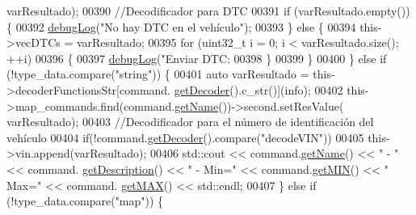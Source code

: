 \begin{DoxyCode}
{{{{{{{{{{      varResultado);
00390                                     \textcolor{comment}{//Decodificador para DTC}
00391                                     \textcolor{keywordflow}{if} (varResultado.empty())\{
00392                                         \hyperlink{debug_8hpp_a55f41cf7b0585224496de3d7adbc101c}{debugLog}(\textcolor{stringliteral}{"No hay DTC en el vehículo"});
00393                                     \} \textcolor{keywordflow}{else} \{
00394                                         this->vecDTCs = varResultado;
00395                                         \textcolor{keywordflow}{for} (uint32\_t i = 0; i < varResultado.size(); ++i)
00396                                         \{
00397                                             \hyperlink{debug_8hpp_a55f41cf7b0585224496de3d7adbc101c}{debugLog}(\textcolor{stringliteral}{"Enviar DTC: %
00398                                         \}
00399                                     \}
00400                                 \} \textcolor{keywordflow}{else} \textcolor{keywordflow}{if} (!type\_data.compare(\textcolor{stringliteral}{"string"})) \{
00401                                     \textcolor{keyword}{auto} varResultado = this->decoderFunctionsStr[command.
      \hyperlink{classCommands_a8b4c2a655d8dd3de334338d6684d469c}{getDecoder}().c\_str()](info);
00402                                     this->map\_commands.find(command.\hyperlink{classCommands_adf3d8a96310b1f4e57a6ecf0f2f153ea}{getName}())->second.setResValue(
      varResultado);
00403                                     \textcolor{comment}{//Decodificador para el número de identificación del vehículo}
00404                                     \textcolor{keywordflow}{if}(!command.\hyperlink{classCommands_a8b4c2a655d8dd3de334338d6684d469c}{getDecoder}().compare(\textcolor{stringliteral}{"decodeVIN"}))
00405                                         this->vin.append(varResultado);
00406                                     std::cout << command.\hyperlink{classCommands_adf3d8a96310b1f4e57a6ecf0f2f153ea}{getName}() << \textcolor{stringliteral}{" - "} << command.
      \hyperlink{classCommands_ad82fe7dfcf1908423bdb59d048020e26}{getDescription}() << \textcolor{stringliteral}{" - Min="} << command.\hyperlink{classCommands_af0a1e2ea65b5a57997c721a8d77a1013}{getMIN}() << \textcolor{stringliteral}{" Max="} << command.
      \hyperlink{classCommands_afbad1051313d0cdecba276384cb7fc6b}{getMAX}() << std::endl;
00407                                 \} \textcolor{keywordflow}{else} \textcolor{keywordflow}{if} (!type\_data.compare(\textcolor{stringliteral}{"map"})) \{
}}}}}}}}}}}
\end{DoxyCode}
